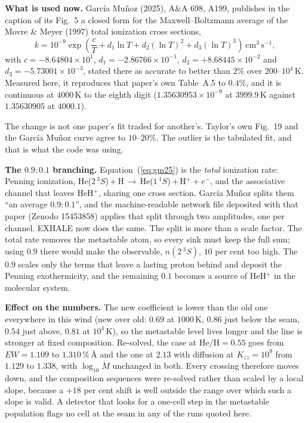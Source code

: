 \documentclass[english,a4paper]{my_memo}
\begin{document}
\medskip
\noindent\textbf{What is used now.} Garc\'ia Mu\~noz (2025), A\&A 698, A199,
publishes in the caption of its Fig.~5 a closed form for the
Maxwell--Boltzmann average of the Movre \& Meyer (1997) total ionization
cross sections,
\begin{equation}
  k = 10^{-9}\exp\!\left(\frac{c}{T} + d_1\ln T + d_2(\ln T)^2
      + d_3(\ln T)^3\right)\ \mathrm{cm^{3}\,s^{-1}},
  \label{eq:gm25}
\end{equation}
with $c = -8.64804\times10^{1}$, $d_1 = -2.86766\times10^{-1}$,
$d_2 = +8.68445\times10^{-2}$ and $d_3 = -5.73001\times10^{-3}$, stated there
as accurate to better than $2\%$ over $200$--$10^{4}$\,K. Measured here, it
reproduces that paper's own Table~A.5 to $0.4\%$, and it is continuous at
$4000$\,K to the eighth digit ($1.35630953\times10^{-9}$ at $3999.9$\,K
against $1.35630905$ at $4000.1$).

The change is not one paper's fit traded for another's. Taylor's own Fig.~19
and the Garc\'ia Mu\~noz curve agree to $10$--$20\%$. The outlier is the
tabulated fit, and that is what the code was using.

\medskip
\noindent\textbf{The $0.9\!:\!0.1$ branching.} Equation~(\ref{eq:gm25}) is
the \emph{total} ionization rate: Penning ionization,
He($2\,^3S$)\,$+$\,H\,$\rightarrow$\,He($1\,^1S$)\,$+$\,H$^+ + e^-$, and the
associative channel that leaves HeH$^+$, sharing one cross section. Garc\'ia
Mu\~noz splits them ``an average $0.9\!:\!0.1$'', and the machine-readable
network file deposited with that paper (Zenodo 15453858) applies that split
through two amplitudes, one per channel. EXHALE now does the same. The split
is more than a scale factor. The total rate removes the metastable atom, so
every sink must keep the full sum; using $0.9$ there would make the
observable, $n(2\,^3S)$, $10$ per cent too high. The $0.9$ scales only the
terms that leave a lasting proton behind and deposit the Penning
exothermicity, and the remaining $0.1$ becomes a source of HeH$^+$ in the
molecular system.

\medskip
\noindent\textbf{Effect on the numbers.} The new coefficient is lower than
the old one everywhere in this wind (new over old: $0.69$ at $1000$\,K,
$0.86$ just below the seam, $0.54$ just above, $0.81$ at $10^{4}$\,K), so the
metastable level lives longer and the line is stronger at fixed composition.
Re-solved, the case at $\mathrm{He/H} = 0.55$ goes from $EW = 1.109$ to
$1.310$\,\%\,\AA{} and the one at $2.13$ with diffusion at
$K_{zz} = 10^{9}$ from $1.129$ to $1.338$, with $\log_{10}\dot M$ unchanged
in both. Every crossing therefore moves down, and the composition sequences
were re-solved rather than scaled by a local slope, because a $+18$ per cent
shift is well outside the range over which such a slope is valid. A detector
that looks for a one-cell step in the metastable population flags no cell at
the seam in any of the runs quoted here.
\end{document}
